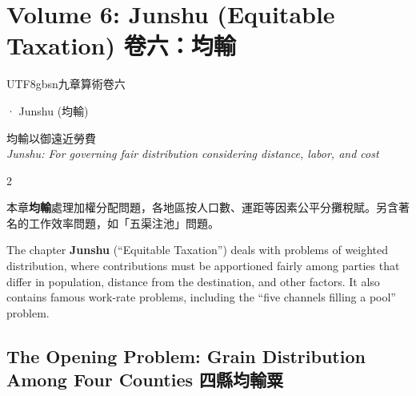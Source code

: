 \documentclass[10pt,a4paper]{article}
\begin{document}
\newpage

\section{Volume 6: Junshu (Equitable Taxation) 卷六：均輸}

\begin{volumeheader}{\begin{CJK}{UTF8}{gbsn}九章算術卷六\end{CJK} · Junshu (均輸)}
均輸以御遠近勞費\\[0.2em]
\small\textit{Junshu: For governing fair distribution considering distance, labor, and cost}
\end{volumeheader}

\vspace{0.3cm}

\begin{paracol}{2}
\begin{leftcolumn*}
本章\textbf{均輸}處理加權分配問題，各地區按人口數、運距等因素公平分攤稅賦。另含著名的工作效率問題，如「五渠注池」問題。
\end{leftcolumn*}
\begin{rightcolumn*}
The chapter \textbf{Junshu} (``Equitable Taxation'') deals with problems of weighted distribution, where contributions must be apportioned fairly among parties that differ in population, distance from the destination, and other factors. It also contains famous work-rate problems, including the ``five channels filling a pool'' problem.
\end{rightcolumn*}
\end{paracol}

\subsection{The Opening Problem: Grain Distribution Among Four Counties 四縣均輸粟}
\end{document}
